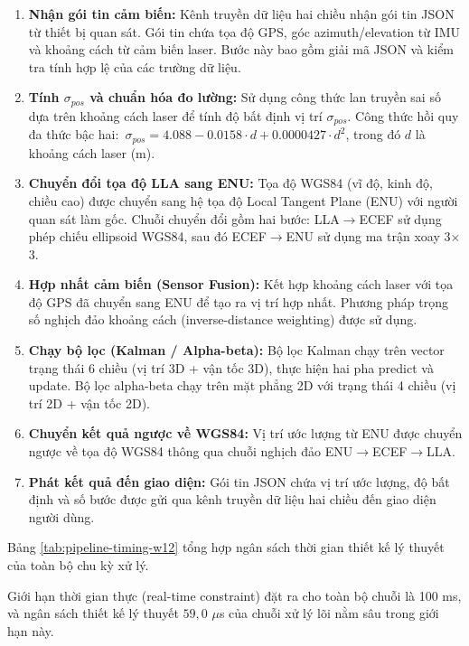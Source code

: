 \begin{enumerate}
    \item \textbf{Nhận gói tin cảm biến:} Kênh truyền dữ liệu hai chiều nhận gói tin JSON từ thiết bị quan sát. Gói tin chứa tọa độ GPS, góc azimuth/elevation từ IMU và khoảng cách từ cảm biến laser. Bước này bao gồm giải mã JSON và kiểm tra tính hợp lệ của các trường dữ liệu.

    \item \textbf{Tính $\sigma_{pos}$ và chuẩn hóa đo lường:} Sử dụng công thức lan truyền sai số dựa trên khoảng cách laser để tính độ bất định vị trí $\sigma_{pos}$. Công thức hồi quy đa thức bậc hai:\ $\sigma_{pos} = 4.088 - 0.0158 \cdot d + 0.0000427 \cdot d^2$, trong đó $d$ là khoảng cách laser (m).

    \item \textbf{Chuyển đổi tọa độ LLA sang ENU:} Tọa độ WGS84 (vĩ độ, kinh độ, chiều cao) được chuyển sang hệ tọa độ Local Tangent Plane (ENU) với người quan sát làm gốc. Chuỗi chuyển đổi gồm hai bước: LLA$\to$ECEF sử dụng phép chiếu ellipsoid WGS84, sau đó ECEF$\to$ENU sử dụng ma trận xoay 3$\times$3.

    \item \textbf{Hợp nhất cảm biến (Sensor Fusion):} Kết hợp khoảng cách laser với tọa độ GPS đã chuyển sang ENU để tạo ra vị trí hợp nhất. Phương pháp trọng số nghịch đảo khoảng cách (inverse-distance weighting) được sử dụng.

    \item \textbf{Chạy bộ lọc (Kalman / Alpha-beta):} Bộ lọc Kalman chạy trên vector trạng thái 6 chiều (vị trí 3D + vận tốc 3D), thực hiện hai pha predict và update. Bộ lọc alpha-beta chạy trên mặt phẳng 2D với trạng thái 4 chiều (vị trí 2D + vận tốc 2D).

    \item \textbf{Chuyển kết quả ngược về WGS84:} Vị trí ước lượng từ ENU được chuyển ngược về tọa độ WGS84 thông qua chuỗi nghịch đảo ENU$\to$ECEF$\to$LLA.

    \item \textbf{Phát kết quả đến giao diện:} Gói tin JSON chứa vị trí ước lượng, độ bất định và số bước được gửi qua kênh truyền dữ liệu hai chiều đến giao diện người dùng.
\end{enumerate}

Bảng \ref{tab:pipeline-timing-w12} tổng hợp ngân sách thời gian thiết kế lý thuyết của toàn bộ chu kỳ xử lý.

Giới hạn thời gian thực (real-time constraint) đặt ra cho toàn bộ chuỗi là 100 ms, và ngân sách thiết kế lý thuyết $59{,}0$ $\mu$s của chuỗi xử lý lõi nằm sâu trong giới hạn này.

